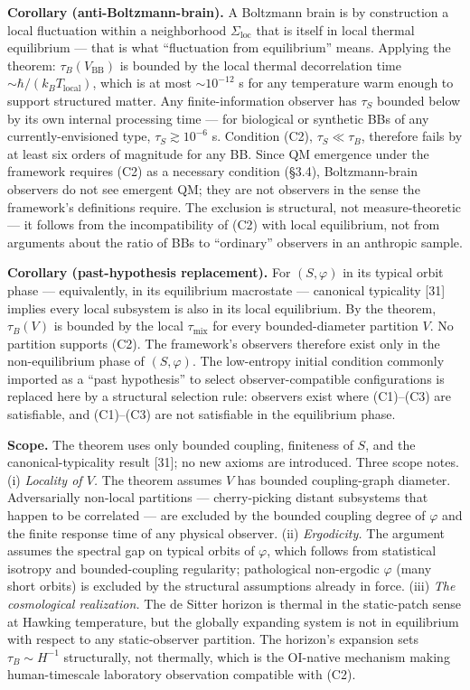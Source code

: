 \documentclass[
]{article}
\begin{document}
\textbf{Corollary (anti-Boltzmann-brain).} A Boltzmann brain is by
construction a local fluctuation within a neighborhood
\(\Sigma_{\text{loc}}\) that is itself in local thermal equilibrium ---
that is what ``fluctuation from equilibrium'' means. Applying the
theorem: \(\tau_B(V_{\text{BB}})\) is bounded by the local thermal
decorrelation time \(\sim \hbar/(k_B T_{\text{local}})\), which is at
most \(\sim 10^{-12}\) s for any temperature warm enough to support
structured matter. Any finite-information observer has \(\tau_S\)
bounded below by its own internal processing time --- for biological or
synthetic BBs of any currently-envisioned type,
\(\tau_S \gtrsim 10^{-6}\) s. Condition (C2), \(\tau_S \ll \tau_B\),
therefore fails by at least six orders of magnitude for any BB. Since QM
emergence under the framework requires (C2) as a necessary condition
(§3.4), Boltzmann-brain observers do not see emergent QM; they are not
observers in the sense the framework's definitions require. The
exclusion is structural, not measure-theoretic --- it follows from the
incompatibility of (C2) with local equilibrium, not from arguments about
the ratio of BBs to ``ordinary'' observers in an anthropic sample.

\textbf{Corollary (past-hypothesis replacement).} For \((S, \varphi)\)
in its typical orbit phase --- equivalently, in its equilibrium
macrostate --- canonical typicality {[}31{]} implies every local
subsystem is also in its local equilibrium. By the theorem,
\(\tau_B(V)\) is bounded by the local \(\tau_{\text{mix}}\) for every
bounded-diameter partition \(V\). No partition supports (C2). The
framework's observers therefore exist only in the non-equilibrium phase
of \((S, \varphi)\). The low-entropy initial condition commonly imported
as a ``past hypothesis'' to select observer-compatible configurations is
replaced here by a structural selection rule: observers exist where
(C1)--(C3) are satisfiable, and (C1)--(C3) are not satisfiable in the
equilibrium phase.

\textbf{Scope.} The theorem uses only bounded coupling, finiteness of
\(S\), and the canonical-typicality result {[}31{]}; no new axioms are
introduced. Three scope notes. (i) \emph{Locality of \(V\).} The theorem
assumes \(V\) has bounded coupling-graph diameter. Adversarially
non-local partitions --- cherry-picking distant subsystems that happen
to be correlated --- are excluded by the bounded coupling degree of
\(\varphi\) and the finite response time of any physical observer. (ii)
\emph{Ergodicity.} The argument assumes the spectral gap on typical
orbits of \(\varphi\), which follows from statistical isotropy and
bounded-coupling regularity; pathological non-ergodic \(\varphi\) (many
short orbits) is excluded by the structural assumptions already in
force. (iii) \emph{The cosmological realization.} The de Sitter horizon
is thermal in the static-patch sense at Hawking temperature, but the
globally expanding system is not in equilibrium with respect to any
static-observer partition. The horizon's expansion sets
\(\tau_B \sim H^{-1}\) structurally, not thermally, which is the
OI-native mechanism making human-timescale laboratory observation
compatible with (C2).
\end{document}
